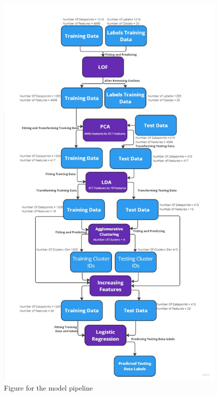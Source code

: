 \documentclass[conference]{IEEEtran}
\begin{document}
\begin{figure}[htbp]
    \hbox{\includegraphics[width=1.3\columnwidth]{Diagram.jpg}}
    \caption{Figure for the model pipeline}
    \label{fig}
\end{figure}
\end{document}
